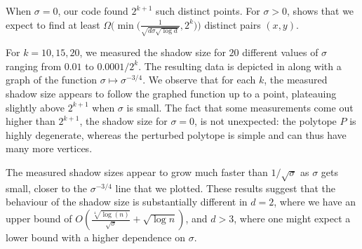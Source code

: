\documentclass{theoretics}
\begin{document}
When $\sigma = 0$, our code found $2^{k+1}$ such distinct points.
For $\sigma > 0$,  shows that we expect to find at least
$\Omega \Big(\min \Big(\frac{1}{\sqrt{d\sigma\sqrt{\log d}}},2^k \Big) \Big)$ distinct pairs $(x,y)$.


For $k = 10,15,20$, we measured the shadow size for $20$ different values of $\sigma$ ranging from $0.01$ to $0.0001/2^k$.
The resulting data is depicted in  along with a graph of the function $\sigma \mapsto \sigma^{-3/4}$.
We observe that for each $k$, the measured shadow size appears to follow the graphed function up to a point,
plateauing slightly above $2^{k+1}$ when $\sigma$ is small.
The fact that some measurements come out higher than $2^{k+1}$, the shadow size for $\sigma = 0$, is not unexpected:
the polytope $P$ is highly degenerate, whereas the perturbed polytope is simple and can thus have many more vertices.



The measured shadow sizes appear to grow much faster than $1/\sqrt\sigma$ as $\sigma$ gets small, closer to the $\sigma^{-3/4}$ line that we plotted.
These results suggest that the behaviour of the shadow size is
substantially different in $d = 2$, where
we have an upper bound of
$O\left(\frac{\sqrt[4]{\log(n)}}{\sqrt\sigma} + \sqrt{\log n}\right)$,
and $d > 3$, where one might expect a lower bound with a higher dependence on $\sigma$.



 
% 
% 

\printbibliography
\end{document}
